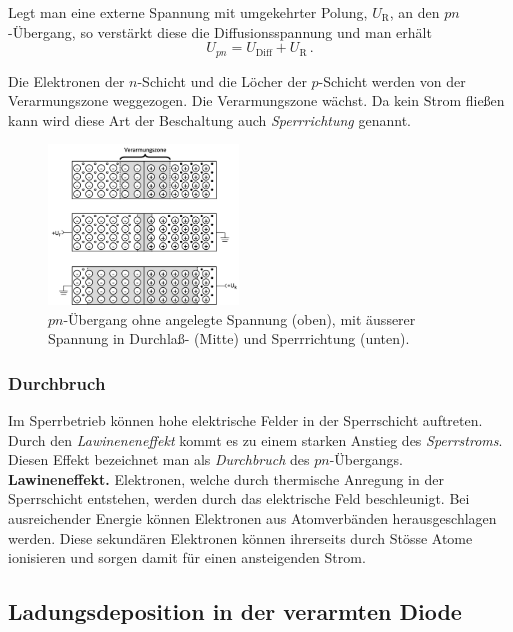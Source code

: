 Legt man eine externe Spannung mit umgekehrter Polung,
$U_{\mathrm{R}}$, an den $pn$-\"Ubergang, so verst\"arkt diese die
Diffusionsspannung und man erh\"alt
%
\begin{equation}
U_{pn} = U_{\mathrm{Diff}} + U_{\mathrm{R}} \, .
\end{equation}

Die Elektronen der $n$-Schicht und die L\"ocher der $p$-Schicht werden
von der Verarmungszone weggezogen. Die Verarmungszone w\"achst. Da
kein Strom fließen kann wird diese Art der Beschaltung auch {\it
Sperrrichtung} genannt.

\begin{figure}[ht!]
\begin{center}
\includegraphics[width=0.45\textwidth]{Abbildungen/pn_Uebergang.jpg}
\end{center}
\caption{$pn$-\"Ubergang ohne angelegte Spannung (oben), mit \"ausserer Spannung in Durchlaß- (Mitte) und Sperrrichtung (unten).}
\label{fig:Verarmung}
\end{figure}

\subsubsection{Durchbruch}

Im Sperrbetrieb k\"onnen hohe elektrische Felder in der Sperrschicht
auftreten. Durch den {\it Lawineneneffekt} kommt
es zu einem starken Anstieg des {\it Sperrstroms}. Diesen Effekt bezeichnet 
man als {\it Durchbruch} des $pn$-\"Ubergangs.\\

\noindent
\textbf{Lawineneffekt.} 
%
Elektronen, welche durch thermische Anregung in der Sperrschicht entstehen,
werden durch das elektrische Feld beschleunigt. Bei ausreichender
Energie k\"onnen Elektronen aus Atomverb\"anden herausgeschlagen
werden. Diese sekund\"aren Elektronen k\"onnen ihrerseits durch
St\"osse Atome ionisieren und sorgen damit f\"ur einen ansteigenden
Strom.

\subsection{Ladungsdeposition in der verarmten Diode}

